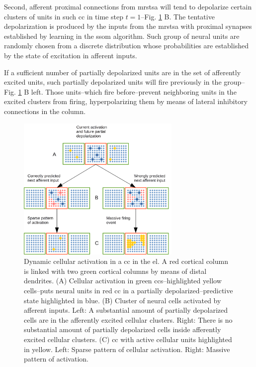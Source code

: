 \documentclass[10pt,letterpaper]{article}
\begin{document}
Second, afferent proximal connections from \gls{mrstsa} will tend to depolarize
certain clusters of units in such \gls{cc} in time step $t=1$--Fig. \ref{fig:Activation} B.
The tentative depolarization is produced by the inputs from the \gls{mrstsa} with
proximal synapses established by learning in the \gls{ssom} algorithm. 
Such group of neural units are randomly chosen from a discrete distribution
whose probabilities are established by the state of excitation in afferent inputs.

If a sufficient number of partially depolarized units are in the set of
afferently excited units, such partially depolarized units
will fire previously in the group--Fig. \ref{fig:Activation} B left.
Those units--which fire before--prevent neighboring units in the excited clusters from firing,
hyperpolarizing them by means of lateral inhibitory connections in the column.

\begin{figure}[h!]
    \centering
    \includegraphics[width=0.7\textwidth]{Activation.png}
    \caption{Dynamic cellular activation in a \gls{cc} in the \gls{el}.
    A red cortical column is linked with two green cortical columns by means of distal dendrites.
    (A) Cellular activation in green \glspl{cc}--highlighted yellow cells--puts neural units
    in red \gls{cc} in a partially depolarized--predictive state highlighted in blue.
    (B) Cluster of neural cells activated by afferent inputs.
    Left: A substantial amount of partially depolarized cells are in the afferently excited cellular clusters.
    Right: There is no substantial amount of partially depolarized cells inside afferently excited cellular clusters.
    (C) \gls{cc} with active cellular units highlighted in yellow.
    Left: Sparse pattern of cellular activation.
    Right: Massive pattern of activation.}
    \label{fig:Activation}
\end{figure}
\end{document}

